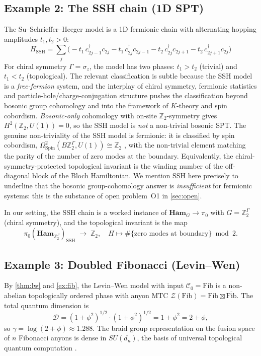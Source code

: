 \documentclass[12pt]{article}
\theoremstyle{plain}
\theoremstyle{definition}
\theoremstyle{remark}
\newcommand{\Ham}{\mathbf{Ham}}
\begin{document}
\subsection{Example 2: The SSH chain (1D SPT)}

The Su--Schrieffer--Heeger model is a 1D fermionic chain with alternating hopping
amplitudes $t_{1},t_{2}>0$:
\begin{equation}
\label{eq:ssh}
H_{\mathrm{SSH}} = \sum_{j}\Big(\!-t_{1}\,c^{\dagger}_{2j-1}c_{2j}
- t_{1}\,c^{\dagger}_{2j}c_{2j-1}
- t_{2}\,c^{\dagger}_{2j}c_{2j+1}
- t_{2}\,c^{\dagger}_{2j+1}c_{2j}\Big)
\end{equation}
For chiral symmetry $\Gamma=\sigma_{z}$, the model has two phases: $t_{1}>t_{2}$
(trivial) and $t_{1}<t_{2}$ (topological). The relevant classification is subtle
because the SSH model is a \emph{free-fermion} system, and the interplay of chiral
symmetry, fermionic statistics and particle-hole/charge-conjugation structure pushes
the classification beyond bosonic group cohomology and into the framework of
$K$-theory and spin cobordism.
\emph{Bosonic-only} cohomology with on-site $\mathbb{Z}_{2}$-symmetry gives
$H^{2}(\mathbb{Z}_{2},U(1))=0$, so the SSH model is \emph{not} a non-trivial bosonic
SPT. The genuine non-triviality of the SSH model is fermionic: it is classified by spin
cobordism, $\Omega^{2}_{\mathrm{Spin}}(B\mathbb{Z}_{2}^{\Gamma},U(1))\cong\mathbb{Z}_{2}$
\cite{FreedHopkins2021}, with the non-trivial element matching the parity of the number
of zero modes at the boundary. Equivalently, the chiral-symmetry-protected topological
invariant is the winding number of the off-diagonal block of the Bloch Hamiltonian.
We mention SSH here precisely to underline that the bosonic group-cohomology answer is
\emph{insufficient} for fermionic systems: this is the substance of open problem~O1 in
\cref{sec:open}.

In our setting, the SSH chain is a worked instance of $\Ham_{G}\to\pi_{0}$ with
$G=\mathbb{Z}_{2}^{\Gamma}$ (chiral symmetry), and the topological invariant is the map
\[
\pi_{0}(\Ham_{\mathbb{Z}_{2}^{\Gamma}})_{\mathrm{SSH}} \;\to\; \mathbb{Z}_{2},
\quad H\mapsto\#\{\text{zero modes at boundary}\}\bmod 2.
\]

\subsection{Example 3: Doubled Fibonacci (Levin--Wen)}

By \cref{thm:lw} and \cref{ex:fib}, the Levin--Wen model with input $\mathcal{C}_{0}=
\mathrm{Fib}$ is a non-abelian topologically ordered phase with anyon MTC
$\mathcal{Z}(\mathrm{Fib})=\mathrm{Fib}\boxtimes\overline{\mathrm{Fib}}$. The total
quantum dimension is
\[
\mathcal{D} = (1+\phi^{2})^{1/2}\cdot(1+\phi^{2})^{1/2} = 1+\phi^{2}=2+\phi,
\]
so $\gamma=\log(2+\phi)\approx 1.288$. The braid group representation on the fusion space
of $n$ Fibonacci anyons is dense in $SU(d_{n})$, the basis of universal topological
quantum computation \cite{Wang2010}.
\end{document}
